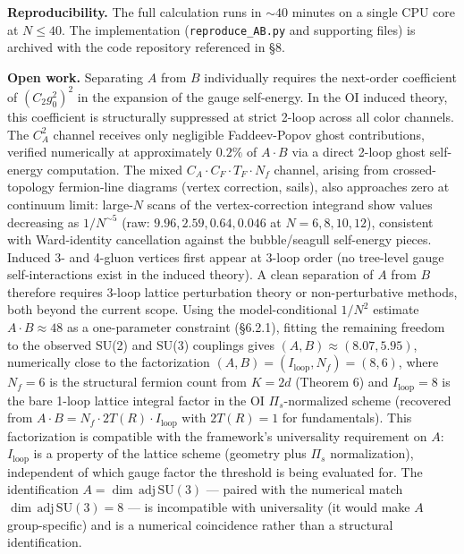 \documentclass[
]{article}
\begin{document}
\textbf{Reproducibility.} The full calculation runs in \(\sim 40\)
minutes on a single CPU core at \(N \leq 40\). The implementation
(\texttt{reproduce\_AB.py} and supporting files) is archived with the
code repository referenced in §8.

\textbf{Open work.} Separating \(A\) from \(B\) individually requires
the next-order coefficient of \((C_2 g_0^2)^2\) in the expansion of the
gauge self-energy. In the OI induced theory, this coefficient is
structurally suppressed at strict 2-loop across all color channels. The
\(C_A^2\) channel receives only negligible Faddeev-Popov ghost
contributions, verified numerically at approximately \(0.2\%\) of
\(A \cdot B\) via a direct 2-loop ghost self-energy computation. The
mixed \(C_A \cdot C_F \cdot T_F \cdot N_f\) channel, arising from
crossed-topology fermion-line diagrams (vertex correction, sails), also
approaches zero at continuum limit: large-\(N\) scans of the
vertex-correction integrand show values decreasing as \(1/N^{\sim 5}\)
(raw: \(9.96, 2.59, 0.64, 0.046\) at \(N = 6, 8, 10, 12\)), consistent
with Ward-identity cancellation against the bubble/seagull self-energy
pieces. Induced 3- and 4-gluon vertices first appear at 3-loop order (no
tree-level gauge self-interactions exist in the induced theory). A clean
separation of \(A\) from \(B\) therefore requires 3-loop lattice
perturbation theory or non-perturbative methods, both beyond the current
scope. Using the model-conditional \(1/N^2\) estimate
\(A \cdot B \approx 48\) as a one-parameter constraint (§6.2.1), fitting
the remaining freedom to the observed SU(2) and SU(3) couplings gives
\((A, B) \approx (8.07, 5.95)\), numerically close to the factorization
\((A, B) = (I_{\text{loop}}, N_f) = (8, 6)\), where \(N_f = 6\) is the
structural fermion count from \(K = 2d\) (Theorem 6) and
\(I_{\text{loop}} = 8\) is the bare 1-loop lattice integral factor in
the OI \(\Pi_s\)-normalized scheme (recovered from
\(A \cdot B = N_f \cdot 2T(R) \cdot I_{\text{loop}}\) with \(2T(R) = 1\)
for fundamentals). This factorization is compatible with the framework's
universality requirement on \(A\): \(I_{\text{loop}}\) is a property of
the lattice scheme (geometry plus \(\Pi_s\) normalization), independent
of which gauge factor the threshold is being evaluated for. The
identification \(A = \dim\,\mathrm{adj}\,\mathrm{SU}(3)\) --- paired
with the numerical match \(\dim\,\mathrm{adj}\,\mathrm{SU}(3) = 8\) ---
is incompatible with universality (it would make \(A\) group-specific)
and is a numerical coincidence rather than a structural identification.
\end{document}
